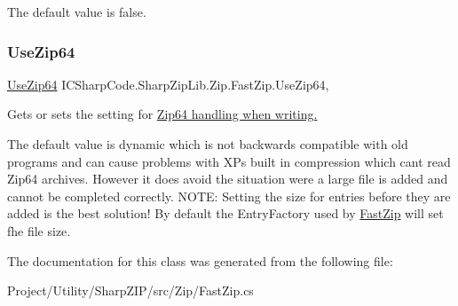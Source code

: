 The default value is false.\mbox{\label{class_i_c_sharp_code_1_1_sharp_zip_lib_1_1_zip_1_1_fast_zip_ac4e6307152ee6e83426c8844d9ef89ee}} 
\subsubsection{\texorpdfstring{Use\+Zip64}{UseZip64}}
{\footnotesize\ttfamily \hyperlink{namespace_i_c_sharp_code_1_1_sharp_zip_lib_1_1_zip_aaa66f18625e7ce19069972caf7bc69a0}{Use\+Zip64} I\+C\+Sharp\+Code.\+Sharp\+Zip\+Lib.\+Zip.\+Fast\+Zip.\+Use\+Zip64\hspace{0.3cm}{\ttfamily [get]}, {\ttfamily [set]}}



Gets or sets the setting for \hyperlink{class_i_c_sharp_code_1_1_sharp_zip_lib_1_1_zip_1_1_fast_zip_ac4e6307152ee6e83426c8844d9ef89ee}{Zip64 handling when writing.} 

The default value is dynamic which is not backwards compatible with old programs and can cause problems with XP\textquotesingle{}s built in compression which cant read Zip64 archives. However it does avoid the situation were a large file is added and cannot be completed correctly. N\+O\+TE\+: Setting the size for entries before they are added is the best solution! By default the Entry\+Factory used by \hyperlink{class_i_c_sharp_code_1_1_sharp_zip_lib_1_1_zip_1_1_fast_zip}{Fast\+Zip} will set fhe file size. 

The documentation for this class was generated from the following file\+:\begin{DoxyCompactItemize}
\item 
Project/\+Utility/\+Sharp\+Z\+I\+P/src/\+Zip/Fast\+Zip.\+cs\end{DoxyCompactItemize}

